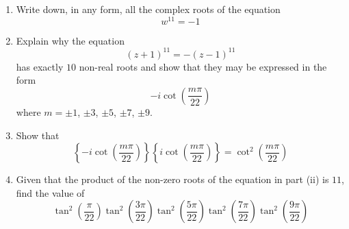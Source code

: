 \documentclass[leqno]{article}
\begin{document}
\begin{enumerate}[
  label=\textbf{\arabic*.},
  leftmargin=*,
  topsep=0pt,
  partopsep=0pt,
  parsep=0pt
]
\begin{enumerate}[label=\textbf{(\roman*)}]
  \item Write down, in any form, all the complex roots of the equation
  \[
  w^{11}=-1
  \]
  \item Explain why the equation
  \[
  (z+1)^{11}=-(z-1)^{11}
  \]
  has exactly $10$ non-real roots and show that they may be expressed in the form
  \[
  -i\cot\left(\frac{m\pi}{22}\right)
  \]
  where $m=\pm 1$, $\pm 3$, $\pm 5$, $\pm 7$, $\pm 9$. 
  \item Show that
  \[
  \left\{-i\cot\left(\frac{m\pi}{22}\right)\right\}\left\{i\cot\left(\frac{m\pi}{22}\right)\right\}=\cot^2\left(\frac{m\pi}{22}\right)
  \]
  \item Given that the product of the non-zero roots of the equation in part (ii) is $11$, find the value of
  \[
  \tan^2\left(\frac{\pi}{22}\right)\tan^2\left(\frac{3\pi}{22}\right)\tan^2\left(\frac{5\pi}{22}\right)\tan^2\left(\frac{7\pi}{22}\right)\tan^2\left(\frac{9\pi}{22}\right)
  \]
\end{enumerate}
\end{enumerate}
\end{document}

